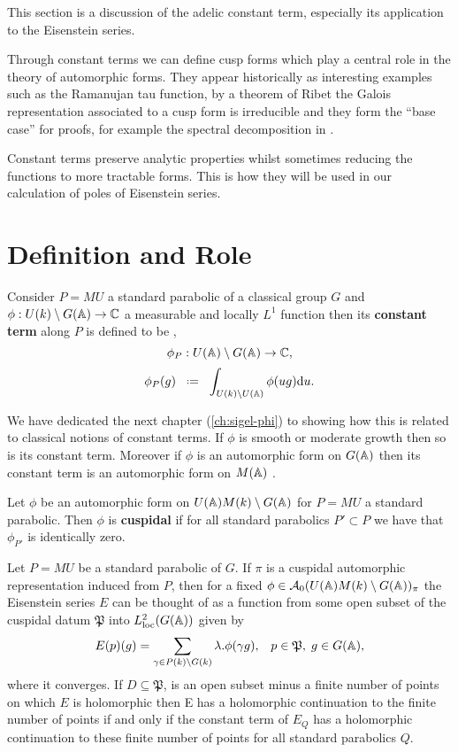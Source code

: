 This section is a discussion of the adelic constant term, especially its application to the Eisenstein series. 

Through constant terms we can define cusp forms which play a central role in the theory of automorphic forms. They appear historically as interesting examples such as the Ramanujan tau function, by a theorem of Ribet \cite[T2.3]{serreProceedingsInternationalConference1977} the Galois representation associated to a cusp form is irreducible and they form the ``base case'' for proofs, for example the spectral decomposition in \cite{moeglinSpectralDecompositionEisenstein1995}.

Constant terms preserve analytic properties whilst sometimes reducing the functions to more tractable forms. This is how they will be used in our calculation of poles of Eisenstein series.\label{constant_terms}


\section{Definition and Role} \label{cuspidal_form_definition}\label{sec:L-functions}
Consider \(P=MU\) a standard parabolic of a classical group \(G\) and \(\phi: U(k)\setminus G(\A) \to \C\) a measurable and locally \(L^1\) function then its \textbf{constant term} along \(P\) is defined to be \cite[I.2.6]{moeglinSpectralDecompositionEisenstein1995},
\[\phi_P :  U(\A)\setminus G(\A) \to \C,\]
\[\phi_P(g) \defeq \int_{U(k)\setminus U(\A)}\phi(ug) \mathrm{d}u.\]

We have dedicated the next chapter (\ref{ch:sigel-phi}) to showing how this is related to classical notions of constant terms. If \(\phi\) is smooth or moderate growth then so is its constant term. Moreover if \(\phi\) is an automorphic form on \(G(\A)\) then its constant term is an automorphic form on \(M(\A)\) \cite[6.5]{getzIntroductionAutomorphicRepresentations2024}.

Let \(\phi\) be an automorphic form on \(U(\A)M(k)\setminus G(\A)\) for \(P = MU\) a standard parabolic. Then \(\phi\) is \textbf{cuspidal} if for all standard parabolics \(P'\subset P\) we have that \(\phi_{P'}\) is identically zero. 

\begin{Theorem}
		Let \(P = MU\) be a standard parabolic of \(G\). If \(\pi\) is a cuspidal automorphic representation induced from \(P\), then for a fixed \(\phi \in\mathcal{A}_0(U(\A)M(k)\setminus G(\A))_\pi \) the Eisenstein series \(E\) can be thought of as a function from some open subset of the cuspidal datum \(\mathfrak{P}\) into \(L^2_{\mathrm{loc}}(G(\A))\) given by 
		\[E(p)(g) = \sum_{\gamma \in P(k)\backslash G(k)} \lambda.\phi(\gamma g), \;\;\; p\in \mathfrak{P},\; g\in G(\A),\]
		where it converges. 
		If \(D\subseteq \mathfrak{P}\), is an open subset minus a finite number of points on which \(E\) is holomorphic then E has a holomorphic continuation to the finite number of points if and only if the constant term of \(E_Q\) has a holomorphic continuation to these finite number of points for all standard parabolics \(Q\).
    \end{Theorem}
    
